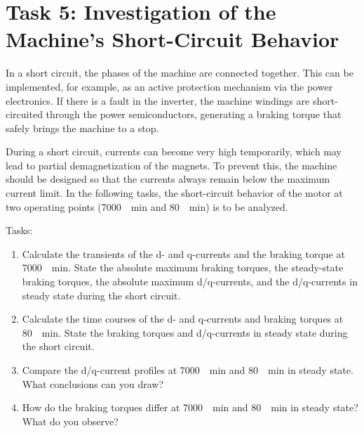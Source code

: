 %
%

\chapter{Task 5: Investigation of the Machine’s Short-Circuit Behavior}

In a short circuit, the phases of the machine are connected together. This can be implemented, for example, as an active protection mechanism via the power electronics. If there is a fault in the inverter, the machine windings are short-circuited through the power semiconductors, generating a braking torque that safely brings the machine to a stop. 

During a short circuit, currents can become very high temporarily, which may lead to partial demagnetization of the magnets. To prevent this, the machine should be designed so that the currents always remain below the maximum current limit. In the following tasks, the short-circuit behavior of the motor at two operating points (\SI{7000}{\per\minute} and \SI{80}{\per\minute}) is to be analyzed.

\bigskip

Tasks:
\begin{enumerate}
	\item Calculate the transients of the d- and q-currents and the braking torque at \SI{7000}{\per\minute}. State the absolute maximum braking torques, the steady-state braking torques, the absolute maximum d/q-currents, and the d/q-currents in steady state during the short circuit.
	\item Calculate the time courses of the d- and q-currents and braking torques at \SI{80}{\per\minute}. State the braking torques and d/q-currents in steady state during the short circuit.
	\item Compare the d/q-current profiles at \SI{7000}{\per\minute} and \SI{80}{\per\minute} in steady state. What conclusions can you draw? 
	\item How do the braking torques differ at \SI{7000}{\per\minute} and \SI{80}{\per\minute} in steady state? What do you observe? 
\end{enumerate}

\newpage

